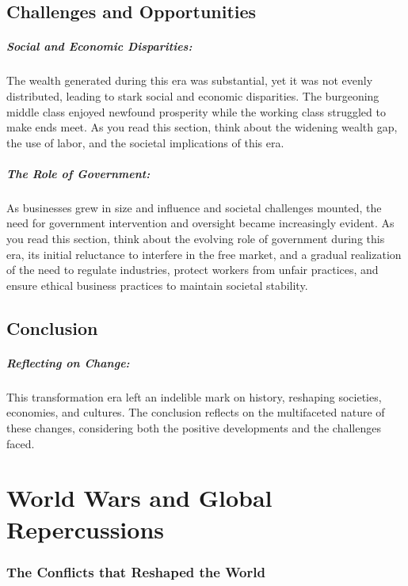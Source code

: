 \documentclass[a4paper,12pt]{book}
\begin{document}
\section*{Challenges and Opportunities}

\paragraph{Social and Economic Disparities:}
The wealth generated during this era was substantial, yet it was not evenly distributed, leading to stark social and economic disparities. The burgeoning middle class enjoyed newfound prosperity while the working class struggled to make ends meet. As you read this section, think about the widening wealth gap, the use of labor, and the societal implications of this era.

\paragraph{The Role of Government:}
As businesses grew in size and influence and societal challenges mounted, the need for government intervention and oversight became increasingly evident. As you read this section, think about the evolving role of government during this era, its initial reluctance to interfere in the free market, and a gradual realization of the need to regulate industries, protect workers from unfair practices, and ensure ethical business practices to maintain societal stability.

\section*{Conclusion}

\paragraph{Reflecting on Change:}
This transformation era left an indelible mark on history, reshaping societies, economies, and cultures. The conclusion reflects on the multifaceted nature of these changes, considering both the positive developments and the challenges faced.

\chapter{World Wars and Global Repercussions}
\subsection*{The Conflicts that Reshaped the World}
\end{document}
